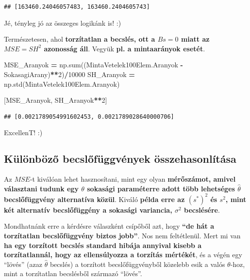 \documentclass[
]{book}
\newenvironment{Shaded}{\begin{snugshade}}{\end{snugshade}}
\newcommand{\BuiltInTok}[1]{#1}
\newcommand{\DecValTok}[1]{\textcolor[rgb]{0.00,0.00,0.81}{#1}}
\newcommand{\NormalTok}[1]{#1}
\newcommand{\OperatorTok}[1]{\textcolor[rgb]{0.81,0.36,0.00}{\textbf{#1}}}
\begin{document}
\begin{verbatim}
## [163460.24046057483, 163460.2404605743]
\end{verbatim}

Jé, tényleg jó az összeges logikánk is! :)

Természetesen, ahol \textbf{torzítatlan a becslés, ott a \(Bs=0\) miatt az \(MSE = SH^2\) azonosság áll}. Vegyük \textbf{pl. a mintaarányok esetét}.

\begin{Shaded}
\begin{Highlighting}[]
\NormalTok{MSE\_Aranyok }\OperatorTok{=}\NormalTok{ np.}\BuiltInTok{sum}\NormalTok{((MintaVetelek100Elem.Aranyok }\OperatorTok{{-}}\NormalTok{ SokasagiArany)}\OperatorTok{**}\DecValTok{2}\NormalTok{)}\OperatorTok{/}\DecValTok{10000}
\NormalTok{SH\_Aranyok }\OperatorTok{=}\NormalTok{ np.std(MintaVetelek100Elem.Aranyok)}

\NormalTok{[MSE\_Aranyok, SH\_Aranyok}\OperatorTok{**}\DecValTok{2}\NormalTok{]}
\end{Highlighting}
\end{Shaded}

\begin{verbatim}
## [0.0021789054991602453, 0.0021789028640000706]
\end{verbatim}

ExcellenT! :)

\subsection{Különböző becslőfüggvények összehasonlítása}\label{kuxfcluxf6nbuxf6zux151-becslux151fuxfcggvuxe9nyek-uxf6sszehasonluxedtuxe1sa}

Az \(MSE\)-t kiválóan lehet hasznosítani, mint egy olyan \textbf{mérőszámot, amivel választani tudunk egy \(\theta\) sokasági paraméterre adott több lehetséges \(\hat{\theta}\) becslőfüggvény alternatíva közül}. Kiváló \textbf{példa erre az \((s^*)^2\) és \(s^2\), mint két alternatív becslőfüggény a sokasági variancia, \(\sigma^2\) becslésére}.

Mondhatnánk erre a kérdésre válaszként csípőből azt, hogy \textbf{``de hát a torzítatlan becslőfüggvény biztos jobb''}. Nos nem feltétlenül. Mert mi van \textbf{ha egy torzított becslés standard hibája annyival kisebb a torzítatlannál, hogy az ellensúlyozza a torzítás mértékét}, és a végén egy ``lövés'' (azaz \(\hat{\theta}\) becslés) a torzított becslőfüggvényből közelebb esik a valós \(\theta\)-hoz, mint a torzítatlan becslésből származó ``lövés''.
\end{document}
